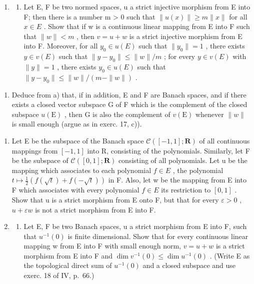 \begin{enumerate}
\def\labelenumi{\arabic{enumi})}
\setcounter{enumi}{17}
\tightlist
\item
  \begin{enumerate}
  \def\labelenumii{\alph{enumii})}
  \tightlist
  \item
    Let E, F be two normed spaces, u a strict injective morphism from E into F; then there is a number m > 0 such that \(\|u(x)\| \geqslant m \|x\|\) for all \(x \in E\) . Show that if w is a continuous linear mapping from E into F such that \(\|w\| < m\) , then \(v = u + w\) is a strict injective morphism from E into F. Moreover, for all \(y_0 \in u(E)\) such that \(\|y_0\| = 1\) , there exists \(y \in v(E)\) such that \(\|y - y_0\| \leqslant \|w\| / m\) ; for every \(y \in v(E)\) with \(\|y\| = 1\) , there exists \(y_0 \in u(E)\) such that \(\|y - y_0\| \leqslant \|w\| / (m - \|w\|)\) .
  \end{enumerate}
\end{enumerate}

\begin{enumerate}
\def\labelenumi{\alph{enumi})}
\setcounter{enumi}{1}
\tightlist
\item
  Deduce from a) that, if in addition, E and F are Banach spaces, and if there exists a closed vector subspace G of F which is the complement of the closed subspace \(u(\mathrm{E})\) , then G is also the complement of \(v(\mathrm{E})\) whenever \(\|w\|\) is small enough (argue as in exerc. 17, c)).
\end{enumerate}

\begin{enumerate}
\def\labelenumi{\arabic{enumi})}
\setcounter{enumi}{18}
\item
  Let E be the subspace of the Banach space \(\mathcal{C}(\left[-1,1\right];\mathbf{R})\) of all continuous mappings from \([-1,1]\) into R, consisting of the polynomials. Similarly, let F be the subspace of \(\mathcal{C}(\left[0,1\right];\mathbf{R})\) consisting of all polynomials. Let u be the mapping which associates to each polynomial \(f\in E\) , the polynomial \(t\mapsto\frac{1}{2}(f(\sqrt{t})+f(-\sqrt{t}))\) in F. Also, let w be the mapping from E into F which associates with every polynomial \(f\in E\) its restriction to \([0,1]\) . Show that u is a strict morphism from E onto F, but that for every \(\varepsilon>0\) , \(u+\varepsilon w\) is not a strict morphism from E into F.
\item
  \begin{enumerate}
  \def\labelenumii{\alph{enumii})}
  \tightlist
  \item
    Let E, F be two Banach spaces, u a strict morphism from E into F, such that \(u^{-1}(0)\) is finite dimensional. Show that for every continuous linear mapping w from E into F with small enough norm, \(v = u + w\) is a strict morphism from E into F and \(\dim v^{-1}(0) \leqslant \dim u^{-1}(0)\) . (Write E as the topological direct sum of \(u^{-1}(0)\) and a closed subspace and use exerc. 18 of IV, p.~66.)
  \end{enumerate}
\end{enumerate}

